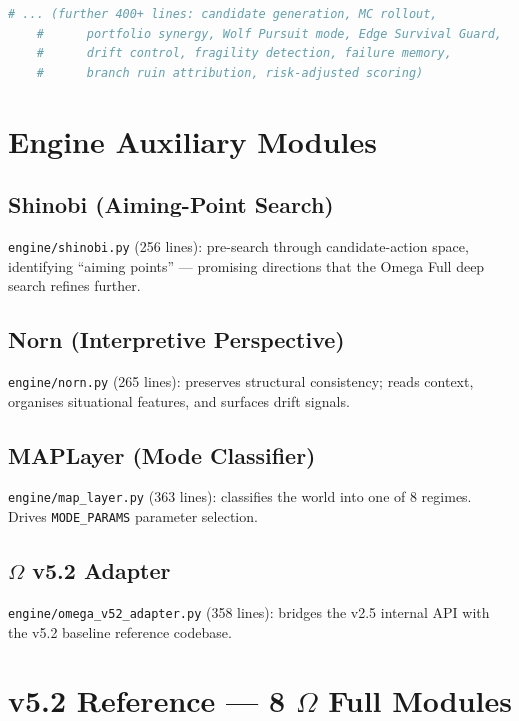 \begin{lstlisting}[language=Python,basicstyle=\ttfamily\scriptsize,frame=single]
    # ... (further 400+ lines: candidate generation, MC rollout,
    #      portfolio synergy, Wolf Pursuit mode, Edge Survival Guard,
    #      drift control, fragility detection, failure memory,
    #      branch ruin attribution, risk-adjusted scoring)
\end{lstlisting}

\section{Engine Auxiliary Modules}
\label{sec:impl-engine-auxiliary}

\subsection{Shinobi (Aiming-Point Search)}

\texttt{engine/shinobi.py} (256 lines): pre-search through
candidate-action space, identifying ``aiming points'' --- promising
directions that the Omega Full deep search refines further.

\subsection{Norn (Interpretive Perspective)}

\texttt{engine/norn.py} (265 lines): preserves structural
consistency; reads context, organises situational features, and
surfaces drift signals.

\subsection{MAPLayer (Mode Classifier)}

\texttt{engine/map\_layer.py} (363 lines): classifies the world into
one of 8 regimes. Drives \texttt{MODE\_PARAMS} parameter selection.


\subsection{$\Omega$ v5.2 Adapter}

\texttt{engine/omega\_v52\_adapter.py} (358 lines): bridges the v2.5
internal API with the v5.2 baseline reference codebase.

\section{v5.2 Reference --- 8 $\Omega$ Full Modules}
\label{sec:impl-v52-reference}

